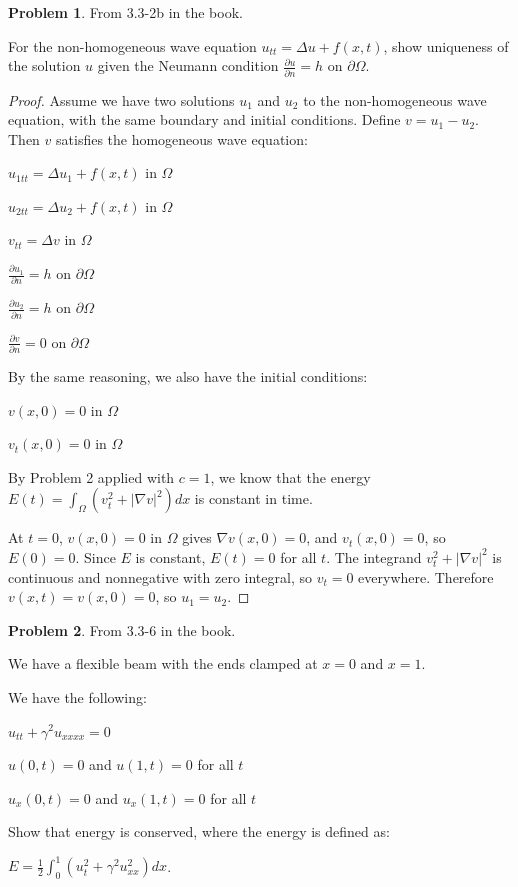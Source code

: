\documentclass[11pt]{article}
\newcommand{\pd}[2]{\frac{\partial #1}{\partial #2}}
\newcommand{\lap}{\Delta}
\newcommand{\grad}{\nabla}
\theoremstyle{definition}
\newtheorem{problem}{Problem}
\begin{document}
\begin{problem}
From 3.3-2b in the book.

For the non-homogeneous wave equation $u_{tt} = \lap u + f(x,t)$,
show uniqueness of the solution $u$ given the Neumann condition $\pd{u}{n} = h$ on $\partial \Omega$.
\end{problem}

\begin{proof}
    Assume we have two solutions $u_1$ and $u_2$ to the non-homogeneous wave equation, with the same boundary and initial conditions. Define $v = u_1 - u_2$. Then $v$ satisfies the homogeneous wave equation:   

$u_{1tt} = \lap u_1 + f(x,t)$ in $\Omega$

$u_{2tt} = \lap u_2 + f(x,t)$ in $\Omega$

$v_{tt} = \lap v$ in $\Omega$

$\pd{u_1}{n} = h$ on $\partial \Omega$

$\pd{u_2}{n} = h$ on $\partial \Omega$

$\pd{v}{n} = 0$ on $\partial \Omega$

By the same reasoning, we also have the initial conditions:

$v(x,0) = 0$ in $\Omega$

$v_t(x,0) = 0$ in $\Omega$

By Problem 2 applied with $c=1$, we know that the energy $E(t) = \int_\Omega (v_t^2 + |\grad v|^2) dx$ is constant in time.

At $t = 0$, $v(x,0) = 0$ in $\Omega$ gives $\grad v(x,0) = 0$, and
$v_t(x,0) = 0$, so $E(0) = 0$. Since $E$ is constant, $E(t) = 0$ for all $t$.
The integrand $v_t^2 + |\grad v|^2$ is continuous and nonnegative with zero
integral, so $v_t = 0$ everywhere. Therefore $v(x,t) = v(x,0) = 0$, so
$u_1 = u_2$.
\end{proof}

\begin{problem}
From 3.3-6 in the book.

We have a flexible beam with the ends clamped at $x=0$ and $x=1$.

We have the following:

$u_{tt} + \gamma^2 u_{xxxx} = 0$

$u(0,t) = 0$ and $u(1,t) = 0$ for all $t$

$u_x(0,t) = 0$ and $u_x(1,t) = 0$ for all $t$

Show that energy is conserved, where the energy is defined as:

$E = \frac{1}{2} \int_0^1 (u_t^2 + \gamma^2 u_{xx}^2) dx$.
\end{problem}
\end{document}
